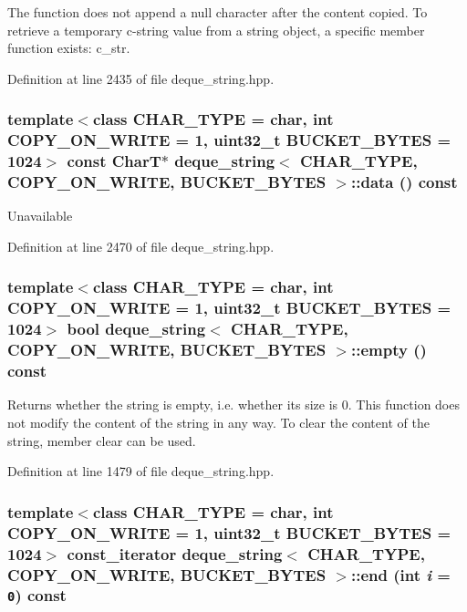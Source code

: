 The function does not append a null character after the content copied. To retrieve a temporary c-string value from a string object, a specific member function exists: c\_\-str. 

Definition at line 2435 of file deque\_\-string.hpp.\hypertarget{classdeque__string_43d0a5c5653559cee6bd477fce3f0a2c}{
\subsubsection[{data}]{\setlength{\rightskip}{0pt plus 5cm}template$<$class CHAR\_\-TYPE  = char, int COPY\_\-ON\_\-WRITE = 1, uint32\_\-t BUCKET\_\-BYTES = 1024$>$ const CharT$\ast$ {\bf deque\_\-string}$<$ CHAR\_\-TYPE, COPY\_\-ON\_\-WRITE, BUCKET\_\-BYTES $>$::data () const}}
\label{classdeque__string_43d0a5c5653559cee6bd477fce3f0a2c}


Unavailable 

Definition at line 2470 of file deque\_\-string.hpp.\hypertarget{classdeque__string_9a087a5f4703f941694db606591f373c}{
\subsubsection[{empty}]{\setlength{\rightskip}{0pt plus 5cm}template$<$class CHAR\_\-TYPE  = char, int COPY\_\-ON\_\-WRITE = 1, uint32\_\-t BUCKET\_\-BYTES = 1024$>$ bool {\bf deque\_\-string}$<$ CHAR\_\-TYPE, COPY\_\-ON\_\-WRITE, BUCKET\_\-BYTES $>$::empty () const}}
\label{classdeque__string_9a087a5f4703f941694db606591f373c}


Returns whether the string is empty, i.e. whether its size is 0. This function does not modify the content of the string in any way. To clear the content of the string, member clear can be used. 

Definition at line 1479 of file deque\_\-string.hpp.\hypertarget{classdeque__string_d0bae9f0e26dae5a1a083fb425c5858a}{
\subsubsection[{end}]{\setlength{\rightskip}{0pt plus 5cm}template$<$class CHAR\_\-TYPE  = char, int COPY\_\-ON\_\-WRITE = 1, uint32\_\-t BUCKET\_\-BYTES = 1024$>$ const\_\-iterator {\bf deque\_\-string}$<$ CHAR\_\-TYPE, COPY\_\-ON\_\-WRITE, BUCKET\_\-BYTES $>$::end (int {\em i} = {\tt 0}) const}}
\label{classdeque__string_d0bae9f0e26dae5a1a083fb425c5858a}


